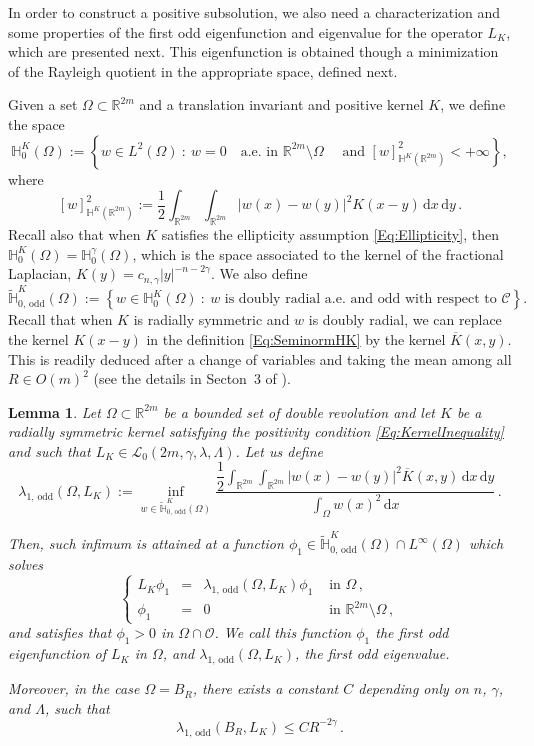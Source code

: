 \documentclass[12pt,reqno]{amsart}
\newtheorem{lemma}[theorem]{Lemma}
\theoremstyle{definition}
\theoremstyle{remark}
\newcommand{\con}[1]{\mathbb{#1}}
\newcommand{\R}{\con{R}} %
\renewcommand{\H}{\con{H}}
\newcommand{\ccal}{\mathscr{C}}
\newcommand{\lcal}{\mathcal{L}}
\newcommand{\ocal}{\mathcal{O}}
\newcommand{\s}{\gamma}
\renewcommand{\d}{\,\mathrm{d}} %
\newcommand{\setcond}[2]{\left \{ #1 \ : \ #2  \right \}}
\newcommand\beqc[1]{\left\{\begin{array}{#1}}
\newcommand\eeqc{\end{array} \right.}
\def\PDEsystem{rcll}
\def\ds{\displaystyle}
\numberwithin{equation}{section}
\begin{document}
In order to construct a positive subsolution, we also need a characterization and some properties of the first odd eigenfunction and eigenvalue for the operator $L_K$, which are presented next. This eigenfunction is obtained though a minimization of the Rayleigh quotient in the appropriate space, defined next.

Given a set $\Omega \subset \R^{2m}$ and a translation invariant and positive kernel $K$, we define the space
$$
\H^K_0(\Omega) := \setcond{w \in L^2(\Omega)}{w = 0 \quad \textrm{a.e. in } \R^{2m} \setminus \Omega \quad \textrm{ and } [w]^2_{\H^K(\R^{2m})} < + \infty},
$$
where
\begin{equation}
\label{Eq:SeminormHK}
[w]^2_{\H^K(\R^{2m})} := \dfrac{1}{2}\int_{\R^{2m}} \int_{\R^{2m}} |w(x) - w(y)|^2 K(x-y) \d x \d y\,.
\end{equation}
Recall also that when $K$ satisfies the ellipticity assumption \eqref{Eq:Ellipticity}, then $\H^K_0 (\Omega) = \H^\s_0 (\Omega)$, which is the space associated to the kernel of the fractional Laplacian, $K(y) = c_{n,\s}|y|^{-n-2\s}$. We also define
$$
\widetilde{\H}^K_{0, \, \mathrm{odd}}(\Omega) := \setcond{w \in \H^K_0(\Omega)}{w \textrm{ is doubly radial a.e. and odd with respect to } \ccal}.
$$
Recall that when $K$ is radially symmetric and $w$ is doubly radial, we can replace the kernel $K(x-y)$ in the definition \eqref{Eq:SeminormHK} by the kernel $\overline{K}(x,y)$. This is readily deduced after a change of variables and taking the mean among all $R\in O(m)^2$ (see the details in Secton~3 of \cite{FelipeSanz-Perela:IntegroDifferentialI}).




\begin{lemma}
	\label{Lemma:FirstOddEigenfunction}
	Let $\Omega\subset \R^{2m} $ be a bounded set of double revolution and let  $K$ be a radially symmetric kernel satisfying the positivity condition \eqref{Eq:KernelInequality} and such that $L_K\in \lcal_0(2m, \s, \lambda, \Lambda)$. Let us define 
	$$
	\lambda_{1, \, \mathrm{odd}}(\Omega, L_K) := \inf_{w \in \widetilde{\H}^K_{0, \, \mathrm{odd}}(\Omega)} \dfrac{\dfrac{1}{2}  \ds\int_{\R^{2m}} \int_{\R^{2m}} |w(x) - w(y)|^2 \overline{K}(x,y) \d x \d y}{ \ds \int_\Omega w(x)^2 \d x}\,.
	$$
	
	Then, such infimum is attained at a function $\phi_1\in \widetilde{\H}^K_{0, \, \mathrm{odd}}(\Omega)\cap L^\infty(\Omega)$ which solves
	$$
	\beqc{\PDEsystem}
	L_K \phi_1 &=& \lambda_{1, \, \mathrm{odd}}(\Omega, L_K) \phi_1 & \textrm{ in } \Omega\,,\\
	\phi_1 & = & 0 & \textrm{ in } \R^{2m}\setminus \Omega\,,
	\eeqc
	$$
	and satisfies that $\phi_1 > 0$ in $\Omega \cap \ocal$.	We call this function $\phi_1$ the \emph{first odd eigenfunction of $L_K$ in $\Omega$}, and $\lambda_{1, \, \mathrm{odd}}(\Omega, L_K) $, the \emph{first odd eigenvalue}. 
	
	Moreover, in the case $\Omega = B_R$, there exists a constant $C$ depending only on $n$, $\s$, and $\Lambda$, such that
	$$
	\lambda_{1, \, \mathrm{odd}}(B_R, L_K) \leq C R^{-2\s}\,. 
	$$ 
\end{lemma}
\end{document}
